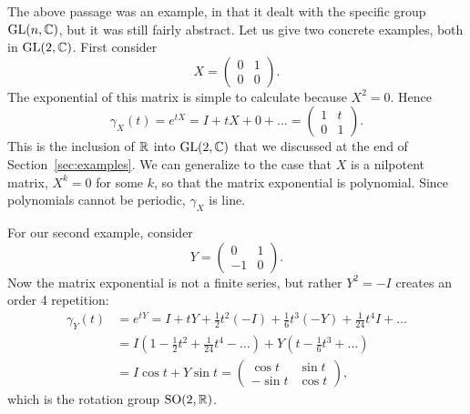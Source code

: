 \begin{example}
\label{eg:subgroups of GL2C}
The above passage was an example, in that it dealt with the specific group $\mathrm{GL}(n,\mathbb{C})$, but it was still fairly abstract.
Let us give two concrete examples, both in $\mathrm{GL}(2,\mathbb{C})$.
First consider
\[
X = \begin{pmatrix}
0 & 1 \\ 0 & 0
\end{pmatrix}.
\]
The exponential of this matrix is simple to calculate because $X^2 = 0$.
Hence
\[
\gamma_X(t) = e^{tX} = I + tX + 0 + \dots
= \begin{pmatrix}
1 & t \\ 0 & 1
\end{pmatrix}.
\]
This is the inclusion of $\mathbb{R}$ into $\mathrm{GL}(2,\mathbb{C})$ that we discussed at the end of Section~\ref{sec:examples}.
We can generalize to the case that $X$ is a nilpotent matrix, $X^k = 0$ for some $k$, so that the matrix exponential is polynomial.
Since polynomials cannot be periodic, $\gamma_X$ is line.

For our second example, consider
\[
Y = \begin{pmatrix}
0 & 1 \\ -1 & 0
\end{pmatrix}.
\]
Now the matrix exponential is not a finite series, but rather $Y^2 = -I$ creates an order 4 repetition:
\begin{align*}
\gamma_Y(t)
&= e^{tY}
= I + tY + \frac{1}{2}t^2(-I) + \frac{1}{6}t^3(-Y) + \frac{1}{24}t^4 I + \dots \\
&= I\left( 1 - \frac{1}{2}t^2 + \frac{1}{24}t^4 - \dots\right) + Y\left(t - \frac{1}{6}t^3 + \dots \right) \\
&= I \cos t + Y \sin t
= \begin{pmatrix}
\cos t & \sin t \\ - \sin t & \cos t
\end{pmatrix},
\end{align*}
which is the rotation group $\mathrm{SO}(2,\mathbb{R})$.
\end{example}


